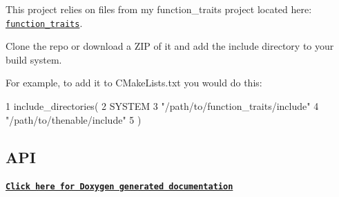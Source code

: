 This project relies on files from my {\ttfamily function\+\_\+traits} project located here\+: \href{https://github.com/novacrazy/function_traits}{\tt function\+\_\+traits}.

Clone the repo or download a Z\+IP of it and add the {\ttfamily \textquotesingle{}include\textquotesingle{}} directory to your build system.

For example, to add it to {\ttfamily C\+Make\+Lists.\+txt} you would do this\+:


\begin{DoxyCode}
1 include\_directories(
2     SYSTEM
3     "/path/to/function\_traits/include"
4     "/path/to/thenable/include"
5 )
\end{DoxyCode}


\subsection*{A\+PI}

\paragraph*{\href{https://novacrazy.github.io/thenable/html/index.html}{\tt Click here for Doxygen generated documentation}}